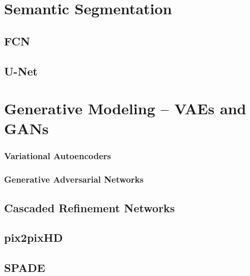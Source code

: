 
\section{Semantic Segmentation}
\subsection{FCN}
\subsection{U-Net} %

\section{Generative Modeling – VAEs and GANs}

\subsubsection{Variational Autoencoders}
\subsubsection{Generative Adversarial Networks}




\subsection{Cascaded Refinement Networks}
\subsection{pix2pixHD} 
\subsection{SPADE} 